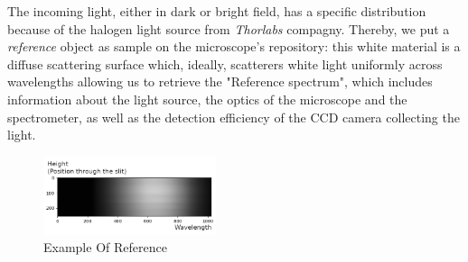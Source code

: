 \documentclass{article}
\numberwithin{equation}{section}
\begin{document}
The incoming light, either in dark or bright field, has a specific distribution because of the halogen light source from  \textit{Thorlabs} compagny. Thereby, we put a \textit{reference} object as sample on the microscope's repository: this white material is a diffuse scattering surface which, ideally, scatterers white light uniformly across wavelengths allowing us to retrieve the "Reference spectrum", which includes information about the light source, the optics of the microscope and the spectrometer, as well as the detection efficiency of the CCD camera collecting the light.
\begin{figure}[h!]
    \centering
    \includegraphics[width=0.45\textwidth, height=0.20\textwidth]{reference_ex.png}
    \caption{Example Of Reference}
    \label{fig:reference_ex}
\end{figure}
\end{document}
